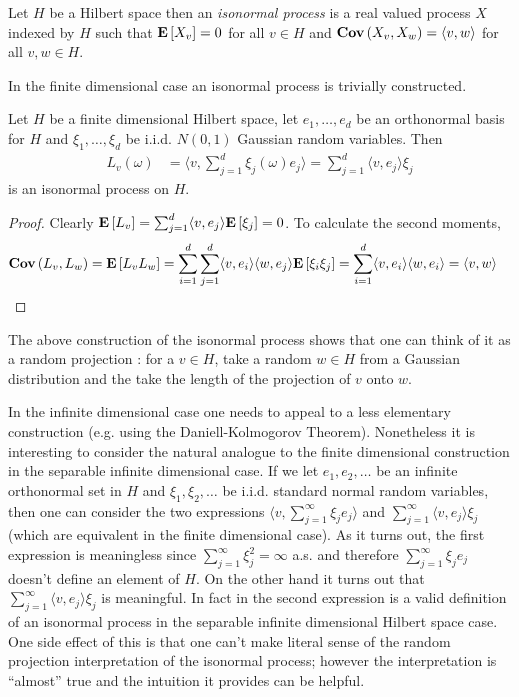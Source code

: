 \begin{defn}Let $H$ be a Hilbert space then an \emph{isonormal process} is a real valued process $X$ indexed by $H$ such that $\textbf{E}\left[X_v\right] = 0$ for all $v \in H$ and $\textbf{Cov} \left (X_v, X_w \right ) = \langle v, w \rangle$ for all $v,w \in H$.
\end{defn}

In the finite dimensional case an isonormal process is trivially constructed.
\begin{prop}\label{IsonormalFiniteDimensional}Let $H$ be a finite dimensional Hilbert space, let $e_1, \dotsc, e_d$ be an orthonormal basis for $H$ and $\xi_1, \dotsc, \xi_d$ be i.i.d. $N(0,1)$ Gaussian random variables. Then 
\begin{align*}
L_v(\omega) &= \langle v, \sum_{j=1}^d \xi_j(\omega) e_j \rangle = \sum_{j=1}^d \langle v, e_j \rangle \xi_j
\end{align*} 
is an isonormal process on $H$.
\end{prop}
\begin{proof}
Clearly $\textbf{E}\left[L_v\right] = \sum_{j=1}^d \langle v, e_j \rangle \textbf{E}\left[\xi_j\right] = 0$.  To calculate the second moments,
\begin{align*}
\textbf{Cov} \left (L_v, L_w \right )  &= \textbf{E}\left[L_v L_w\right]  = \sum_{i=1}^d \sum_{j=1}^d \langle v, e_i \rangle \langle w, e_j \rangle \textbf{E}\left[\xi_i \xi_j\right] = \sum_{i=1}^d \langle v, e_i \rangle \langle w, e_i \rangle = \langle v, w \rangle
\end{align*}
\end{proof}
The above construction of the isonormal process shows that one can think of it as a random projection : for a $v \in H$, take a random $w \in H$ from a Gaussian distribution and the take the length of the projection of $v$ onto $w$.  

In the infinite dimensional case one needs to appeal to a less elementary construction (e.g. using the Daniell-Kolmogorov Theorem).   Nonetheless it is interesting 
to consider the natural analogue to the finite dimensional construction in the separable infinite dimensional case.  If we let $e_1, e_2, \dotsc$ be an infinite orthonormal set in $H$ and $\xi_1, \xi_2, \dotsc$ be i.i.d. standard normal random variables, then one can consider the two expressions $\langle v, \sum_{j=1}^\infty \xi_j e_j \rangle$ and $\sum_{j=1}^\infty \langle v, e_j \rangle \xi_j$ (which are equivalent in the finite dimensional case).  As it turns out, the first expression is meaningless since $\sum_{j=1}^\infty \xi_j^2=\infty$ a.s. and therefore $\sum_{j=1}^\infty \xi_j e_j$ doesn't define an element of $H$.  On the other hand it turns out that $\sum_{j=1}^\infty \langle v, e_j \rangle \xi_j$ is meaningful.  In fact in the second expression is a valid definition of an isonormal process in the separable infinite dimensional Hilbert space case.  One side effect of this is that one can't make literal sense of the random projection interpretation of the isonormal process; however the interpretation is ``almost'' true and the intuition it provides can be helpful.

